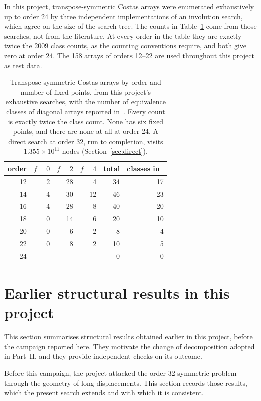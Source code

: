 \documentclass[11pt,a4paper]{article}
\theoremstyle{definition}
\begin{document}
In this project, transpose-symmetric Costas arrays were enumerated exhaustively up to order 24
by three independent implementations of an involution search, which agree on the size of the
search tree. The counts in Table~\ref{tab:symcounts} come from those searches, not from the
literature. At every order in the table they are exactly twice the 2009 class counts, as the
counting conventions require, and both give zero at order 24. The 158 arrays of orders 12--22
are used throughout this project as test data.

\begin{table}[H]
\centering
\begin{tabular}{@{}rrrrrr@{}}
\toprule
order & $f=0$ & $f=2$ & $f=4$ & total & classes in~\cite{taylor2009} \\
\midrule
12 & 2 & 28 & 4 & 34 & 17 \\
14 & 4 & 30 & 12 & 46 & 23 \\
16 & 4 & 28 & 8 & 40 & 20 \\
18 & 0 & 14 & 6 & 20 & 10 \\
20 & 0 & 6 & 2 & 8 & 4 \\
22 & 0 & 8 & 2 & 10 & 5 \\
24 & & & & 0 & 0 \\
\bottomrule
\end{tabular}
\caption{Transpose-symmetric Costas arrays by order and number of fixed points, from this
project's exhaustive searches, with the number of equivalence classes of diagonal arrays reported
in~\cite{taylor2009}. Every count is exactly twice the class count. None has
six fixed points, and there are none at all at order 24. A direct search at order 32, run to completion,
visits $1.355\times10^{11}$ nodes (Section~\ref{sec:direct}).}
\label{tab:symcounts}
\end{table}

\section{Earlier structural results in this project}\label{sec:earlier}
This section summarises structural results obtained earlier in this project, before the campaign reported here. They motivate the change of decomposition adopted in Part~II, and they provide independent checks on its outcome.


Before this campaign, the project attacked the order-32 symmetric problem through the
geometry of long displacements. This section records those results, which the present
search extends and with which it is consistent.
\end{document}
